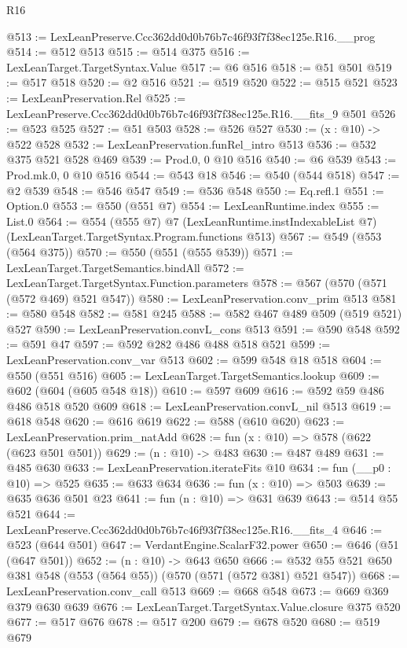 \begin{lexlean}{R16}
\begin{coremodule}
@513 := LexLeanPreserve.Ccc362dd0d0b76b7c46f93f7f38ec125e.R16.__prog
@514 := @512 @513
@515 := @514 @375
@516 := LexLeanTarget.TargetSyntax.Value
@517 := @6 @516
@518 := @51 @501
@519 := @517 @518
@520 := @2 @516
@521 := @519 @520
@522 := @515 @521
@523 := LexLeanPreservation.Rel
@525 := LexLeanPreserve.Ccc362dd0d0b76b7c46f93f7f38ec125e.R16.__fits_9 @501
@526 := @523 @525
@527 := @51 @503
@528 := @526 @527
@530 := (x : @10) -> @522 @528
@532 := LexLeanPreservation.funRel_intro @513
@536 := @532 @375 @521 @528 @469
@539 := Prod.{0, 0} @10 @516
@540 := @6 @539
@543 := Prod.mk.{0, 0} @10 @516
@544 := @543 @18
@546 := @540 (@544 @518)
@547 := @2 @539
@548 := @546 @547
@549 := @536 @548
@550 := Eq.refl.{1}
@551 := Option.{0}
@553 := @550 (@551 @7)
@554 := LexLeanRuntime.index
@555 := List.{0}
@564 := @554
    (@555 @7)
    @7
    (LexLeanRuntime.instIndexableList @7)
    (LexLeanTarget.TargetSyntax.Program.functions @513)
@567 := @549 (@553 (@564 @375))
@570 := @550 (@551 (@555 @539))
@571 := LexLeanTarget.TargetSemantics.bindAll
@572 := LexLeanTarget.TargetSyntax.Function.parameters
@578 := @567 (@570 (@571 (@572 @469) @521 @547))
@580 := LexLeanPreservation.conv_prim @513
@581 := @580 @548
@582 := @581 @245
@588 := @582 @467 @489 @509 (@519 @521) @527
@590 := LexLeanPreservation.convL_cons @513
@591 := @590 @548
@592 := @591 @47
@597 := @592 @282 @486 @488 @518 @521
@599 := LexLeanPreservation.conv_var @513
@602 := @599 @548 @18 @518
@604 := @550 (@551 @516)
@605 := LexLeanTarget.TargetSemantics.lookup
@609 := @602 (@604 (@605 @548 @18))
@610 := @597 @609
@616 := @592 @59 @486 @486 @518 @520 @609
@618 := LexLeanPreservation.convL_nil @513
@619 := @618 @548
@620 := @616 @619
@622 := @588 (@610 @620)
@623 := LexLeanPreservation.prim_natAdd
@628 := fun (x : @10) => @578 (@622 (@623 @501 @501))
@629 := (n : @10) -> @483
@630 := @487 @489
@631 := @485 @630
@633 := LexLeanPreservation.iterateFits @10
@634 := fun (__p0 : @10) => @525
@635 := @633 @634
@636 := fun (x : @10) => @503
@639 := @635 @636 @501 @23
@641 := fun (n : @10) => @631 @639
@643 := @514 @55 @521
@644 := LexLeanPreserve.Ccc362dd0d0b76b7c46f93f7f38ec125e.R16.__fits_4
@646 := @523 (@644 @501)
@647 := VerdantEngine.ScalarF32.power
@650 := @646 (@51 (@647 @501))
@652 := (n : @10) -> @643 @650
@666 := @532 @55 @521 @650 @381 @548 (@553 (@564 @55)) (@570 (@571 (@572 @381) @521 @547))
@668 := LexLeanPreservation.conv_call @513
@669 := @668 @548
@673 := @669 @369 @379 @630 @639
@676 := LexLeanTarget.TargetSyntax.Value.closure @375 @520
@677 := @517 @676
@678 := @517 @200
@679 := @678 @520
@680 := @519 @679

\end{coremodule}
\end{lexlean}
